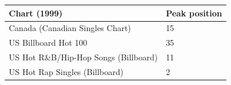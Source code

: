 \documentclass{article}
\begin{document}
\begin{tabular}{ll}
\toprule
Chart (1999) & Peak position \\
\midrule
Canada (Canadian Singles Chart) & 15 \\
US Billboard Hot 100 & 35 \\
US Hot R\&B/Hip-Hop Songs (Billboard) & 11 \\
US Hot Rap Singles (Billboard) & 2 \\
\bottomrule
\end{tabular}
\end{document}

